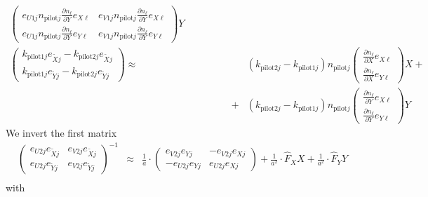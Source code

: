 \documentclass[12pt,a4paper,twoside,openright,BCOR10mm,headsepline,titlepage,abstracton,chapterprefix,final]{scrreprt}
\newcommand\wavenumber{k}
\newcommand\pilot{\textrm{pilot}}
\begin{document}
\begin{eqnarray}
 \begin{pmatrix}
  e_{U1j} n_{\pilot j} \frac{\partial n_\ell}{\partial Y} e_{X\ell} &  e_{V1j} n_{\pilot j} \frac{\partial n_\ell}{\partial Y} e_{X\ell}
   \\
  e_{U1j} n_{\pilot j} \frac{\partial n_\ell}{\partial Y} e_{Y\ell} &  e_{V1j} n_{\pilot j} \frac{\partial n_\ell}{\partial Y} e_{Y\ell}
 \end{pmatrix} Y \qquad\qquad
 \\
 \begin{pmatrix}
  \wavenumber_{\pilot 1 j} e_{\tilde{X}j} - \wavenumber_{\pilot 2 j} e_{\tilde{X}j} 
 \\
  \wavenumber_{\pilot 1 j} e_{\tilde{Y}j} - \wavenumber_{\pilot 2 j} e_{\tilde{Y}j}
 \end{pmatrix}
 \approx&&
  (\wavenumber_{\pilot 2 j} - \wavenumber_{\pilot 1 j}) n_{\pilot j}
  \begin{pmatrix}
   \frac{\partial n_\ell}{\partial X} e_{X\ell}    \\    \frac{\partial n_\ell}{\partial X} e_{Y\ell}
  \end{pmatrix} X + 
\nonumber\\&+&
  (\wavenumber_{\pilot 2 j} - \wavenumber_{\pilot 1 j}) n_{\pilot j}
  \begin{pmatrix}
   \frac{\partial n_\ell}{\partial Y} e_{X\ell}    \\    \frac{\partial n_\ell}{\partial Y} e_{Y\ell}
  \end{pmatrix} Y  
\end{eqnarray}
We invert the first matrix
\begin{eqnarray}
 \begin{pmatrix}
  e_{U2j} e_{\tilde{X}j}  &  e_{V2j} e_{\tilde{X}j}
   \\
  e_{U2j} e_{\tilde{Y}j}  &  e_{V2j} e_{\tilde{Y}j}
 \end{pmatrix}^{-1}
 &\approx&
 \frac{1}{a}
 \cdot
 \begin{pmatrix}
   e_{V2j} e_{Yj} & -e_{V2j} e_{Xj}
   \\
  -e_{U2j} e_{Yj}  & e_{U2j} e_{Xj}
 \end{pmatrix}
 +
 \frac{1}{a^2}
 \cdot
 \hat{F}_X X
 +
 \frac{1}{a^2}
 \cdot
 \hat{F}_Y Y
 \nonumber\\
\end{eqnarray}
with
\end{document}
